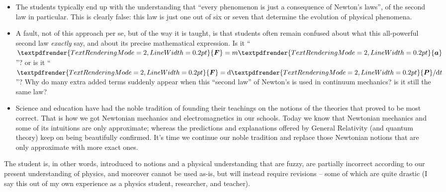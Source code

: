 \documentclass[a4paper,12pt,%
onecolumn,oneside,%
british%
]{memoir}
\renewcommand*{\bm}[1]{\textpdfrender{TextRenderingMode=2,LineWidth=0.2pt}{\boldsymbol{#1}}}
\newcommand*{\di}{\mathrm{d}}%
\renewcommand*{\|}[1][]{\nonscript\:#1\vert\nonscript\:\mathopen{}}
\begin{document}
\begin{itemize}
\item The students typically end up with the understanding that \enquote{every phenomenon is just a consequence of Newton's laws}, of the second law in particular. This is clearly false: this law is just one out of six or seven that determine the evolution of physical phenomena.

\item A fault, not of this approach per se, but of the way it is taught, is that students often remain confused about what this all-powerful second law \emph{exactly} say, and about its precise mathematical expression. Is it \enquote{$\bm{F}=m\bm{a}$}? or is it \enquote{$\bm{F}=\di\bm{P}/\di t$}? Why do many extra added terms suddenly appear when this \enquote{second law} of Newton's is used in continuum mechanics? is it still the same law?

\item Science and education have had the noble tradition of founding their teachings on the notions of the theories that proved to be most correct. That is how we got Newtonian mechanics and electromagnetics in our schools. Today we know that Newtonian mechanics and some of its intuitions are only approximate; whereas the predictions and explanations offered by General Relativity (and quantum theory) keep on being beautifully confirmed. It's time we continue our noble tradition and replace those Newtonian notions that are only approximate with more exact ones.

\end{itemize}

  The student is, in other words, introduced to notions and a physical understanding that are fuzzy, are partially incorrect according to our present understanding of physics, and moreover cannot be used as-is, but will instead require revisions -- some of which are quite drastic (I say this out of my own experience as a physics student, researcher, and teacher).
\end{document}
